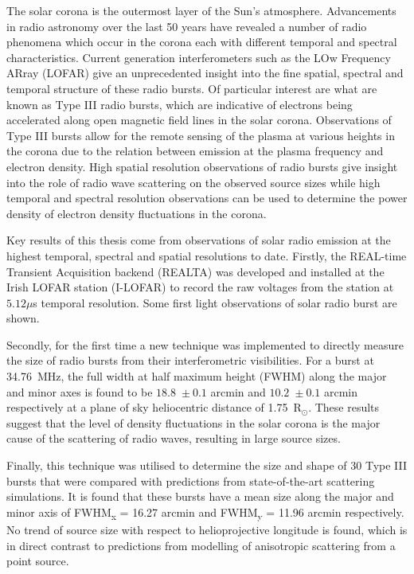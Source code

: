 \begin{abstracts} 
The solar corona is the outermost layer of the Sun's atmosphere. Advancements in radio astronomy over the last 50 years have revealed a number of radio phenomena which occur in the corona each with different temporal and spectral characteristics. Current generation interferometers such as the LOw Frequency ARray (LOFAR) give an unprecedented insight into the fine spatial, spectral and temporal structure of these radio bursts. Of particular interest are what are known as Type III radio bursts, which are indicative of electrons being accelerated along open magnetic field lines in the solar corona. Observations of Type III bursts allow for the remote sensing of the plasma at various heights in the corona due to the relation between emission at the plasma frequency and electron density. High spatial resolution observations of radio bursts give insight into the role of radio wave scattering on the observed source sizes while high temporal and spectral resolution observations can be used to determine the power density of electron density fluctuations in the corona.

Key results of this thesis come from observations of solar radio emission at the highest temporal, spectral and spatial resolutions to date. Firstly, the REAL-time Transient Acquisition backend (REALTA) was developed and installed at the Irish LOFAR station (I-LOFAR) to record the raw voltages from the station at $5.12 \mu$s temporal resolution. Some first light observations of solar radio burst are shown.

Secondly, for the first time a new technique was implemented to directly measure the size of radio bursts from their interferometric visibilities. For a burst at 34.76~MHz, the full width at half maximum height (FWHM) along the major and minor axes is found to be $18.8$~$\pm~0.1$ arcmin and $10.2$~$\pm~0.1$ arcmin respectively at a plane of sky heliocentric distance of 1.75~R$_\odot$. These results suggest that the level of density fluctuations in the solar corona  is  the  major  cause  of  the  scattering  of  radio  waves, resulting in  large  source  sizes.

Finally, this technique was utilised to determine the size and shape of 30 Type III bursts that were compared with predictions from state-of-the-art scattering simulations. It is found that these bursts have a mean size along the major and minor axis of FWHM\textsubscript{x} = 16.27 arcmin and FWHM\textsubscript{y} = 11.96 arcmin respectively. No trend of source size with respect to helioprojective longitude is found, which is in direct contrast to predictions from modelling of anisotropic scattering from a point source.


\end{abstracts}
